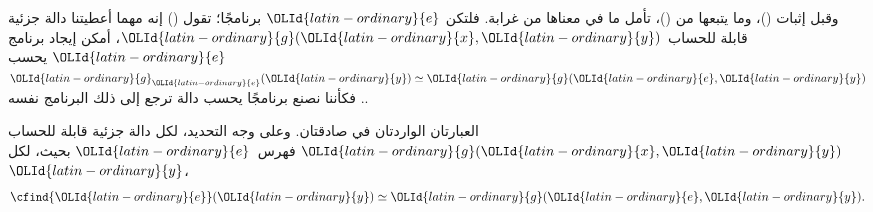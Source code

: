 \documentclass[../../../include/open-logic-section]{subfiles}
\begin{document}
\begin{explain}
وقبل إثبات ()، وما يتبعها من ()، تأمل ما في معناها من غرابة.
فلتكن ${\OLId{latin-ordinary}{e}}$ برنامجًا؛ تقول () إنه مهما أعطيتنا
دالة جزئية قابلة للحساب ${\OLId{latin-ordinary}{g}}({\OLId{latin-ordinary}{x}},{\OLId{latin-ordinary}{y}})$، أمكن إيجاد برنامج ${\OLId{latin-ordinary}{e}}$
يحسب ${\OLId{latin-ordinary}{g}}_{\OLId{latin-ordinary}{e}}({\OLId{latin-ordinary}{y}}) \simeq {\OLId{latin-ordinary}{g}}({\OLId{latin-ordinary}{e}},{\OLId{latin-ordinary}{y}})$. فكأننا نصنع برنامجًا يحسب
دالة ترجع إلى ذلك البرنامج نفسه.
\end{explain}

\begin{thm}
العبارتان الواردتان في  صادقتان. وعلى وجه
التحديد، لكل دالة جزئية قابلة للحساب ${\OLId{latin-ordinary}{g}}({\OLId{latin-ordinary}{x}},{\OLId{latin-ordinary}{y}})$ فهرس~${\OLId{latin-ordinary}{e}}$ بحيث،
لكل~${\OLId{latin-ordinary}{y}}$،
\[
\cfind{{\OLId{latin-ordinary}{e}}}({\OLId{latin-ordinary}{y}}) \simeq {\OLId{latin-ordinary}{g}}({\OLId{latin-ordinary}{e}},{\OLId{latin-ordinary}{y}}).
\]
\end{thm}
\end{document}
